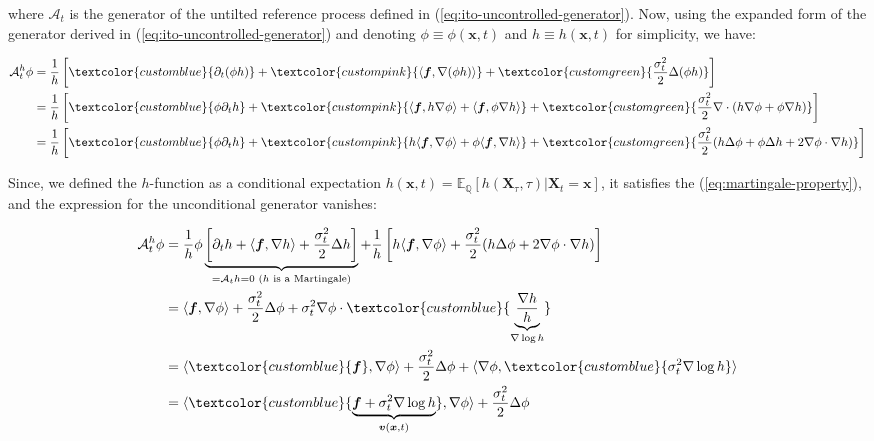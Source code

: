 \documentclass{article}
\newcommand{\bluetext}[1]{\textcolor{customblue}{#1}}
\newcommand{\greentext}[1]{\textcolor{customgreen}{#1}}
\newcommand{\pinktext}[1]{\textcolor{custompink}{#1}}
\begin{document}
where $\mathcal{A}_t$ is the generator of the untilted reference process defined in (\ref{eq:ito-uncontrolled-generator}). Now, using the expanded form of the generator derived in (\ref{eq:ito-uncontrolled-generator}) and denoting $\phi\equiv\phi(\boldsymbol{x},t)$ and $h\equiv h(\boldsymbol{x},t)$ for simplicity, we have:
\begin{small}
\begin{align}
    \mathcal{A}^h_t\phi&=\frac{1}{h}\left[\bluetext{\partial_t(\phi h )}+\pinktext{\langle \boldsymbol{f}, \nabla (\phi h)\rangle}+\greentext{\frac{\sigma_t^2}{2}\Delta(\phi h)}\right]\nonumber\\
    &=\frac{1}{h}\left[\bluetext{\phi\partial_th} +\pinktext{\langle \boldsymbol{f}, h\nabla \phi\rangle+\langle \boldsymbol{f},\phi\nabla h\rangle} +\greentext{\frac{\sigma_t^2}{2} \nabla\cdot (h\nabla \phi +\phi\nabla h)}\right]\nonumber\\
    &=\frac{1}{h}\left[\bluetext{\phi\partial_th} +\pinktext{h\langle \boldsymbol{f}, \nabla \phi\rangle+\phi\langle \boldsymbol{f},\nabla h\rangle} +\greentext{\frac{\sigma_t^2}{2}(h\Delta \phi +\phi\Delta h+2\nabla \phi\cdot \nabla h) }\right]\nonumber\\
\end{align}
\end{small}
Since, we defined the $h$-function as a conditional expectation $h(\boldsymbol{x},t)=\mathbb{E}_{\mathbb{Q}}[h(\boldsymbol{X}_\tau,\tau)|\boldsymbol{X}_t=\boldsymbol{x}]$, it satisfies the (\ref{eq:martingale-property}), and the expression for the unconditional generator vanishes:
\begin{small}
\begin{align}
    \mathcal{A}^h_t\phi&=\frac{1}{h}\phi\underbrace{\left[\partial_th +\langle \boldsymbol{f},\nabla h\rangle +\frac{\sigma_t^2}{2}\Delta h\right]}_{=\mathcal{A}_th=0\text{ ($h$ is a Martingale)}} +\frac{1}{h}\left[h\langle \boldsymbol{f}, \nabla \phi\rangle+\frac{\sigma_t^2}{2}(h\Delta \phi+2\nabla \phi\cdot \nabla h)\right]\nonumber\\
    &=\langle \boldsymbol{f}, \nabla \phi\rangle+\frac{\sigma_t^2}{2}\Delta \phi +\sigma_t^2\nabla \phi\cdot \bluetext{\underbrace{\frac{\nabla h}{h}}_{\nabla \log h}}\nonumber\\
    &=\langle \bluetext{\boldsymbol{f}}, \nabla \phi\rangle+\frac{\sigma_t^2}{2}\Delta \phi +\langle\nabla \phi, \bluetext{\sigma_t^2\nabla \log h}\rangle\nonumber\\
    &=\langle \bluetext{\underbrace{\boldsymbol{f}+\sigma_t^2\nabla \log h}_{\boldsymbol{v}(\boldsymbol{x},t)}}, \nabla \phi\rangle+\frac{\sigma_t^2}{2}\Delta \phi 
\end{align}
\end{small}
\end{document}
